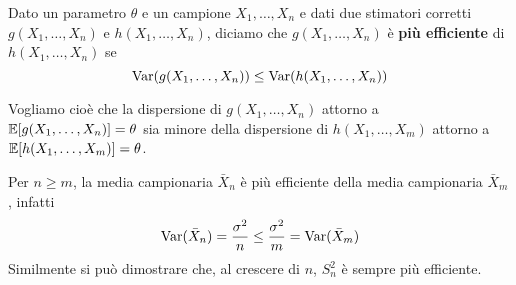 \begin{definition}\label{def: stimatore efficiente}
	Dato un parametro $\theta$ e un campione $X_1, \dots, X_n$ e dati due stimatori corretti
	$g(X_1, \dots, X_n)$ e $h(X_1, \dots, X_n)$, diciamo che $g(X_1, \dots, X_n)$ è
	\textbf{più efficiente} di $h(X_1, \dots, X_n)$ se
	\[ \operatorname{Var}(g(X_1, \dots, X_n)) \leq \operatorname{Var}(h(X_1, \dots, X_n)) \]
\end{definition}

Vogliamo cioè che la dispersione di $g(X_1, \dots, X_n)$ attorno a
$\mathbb{E}[g(X_1, \dots, X_n)] = \theta$ sia minore della dispersione di $h(X_1, \dots, X_m)$ attorno a
$\mathbb{E}[h(X_1, \dots, X_m)] = \theta$.

Per $n \geq m$, la media campionaria $\bar{X}_n$ è più efficiente della media campionaria
$\bar{X}_m$, infatti
\[ \operatorname{Var}(\bar{X}_n) = \frac{\sigma^2}{n} \leq \frac{\sigma^2}{m} = \operatorname{Var}(\bar{X}_m) \]
Similmente si può dimostrare che, al crescere di $n$, $S_n^2$ è sempre più efficiente.